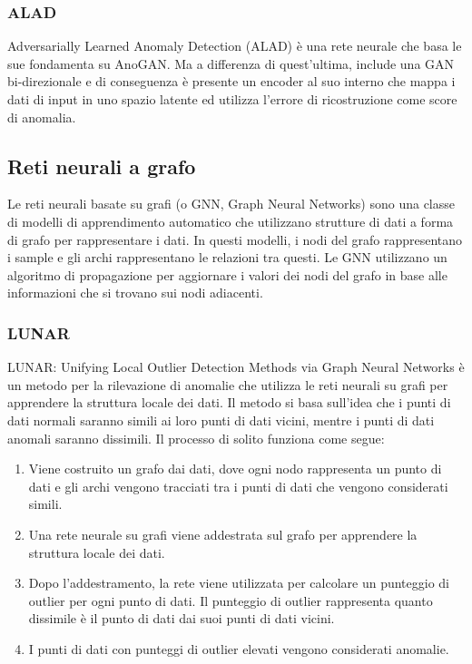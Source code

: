 \subsubsection{ALAD}
Adversarially Learned Anomaly Detection (ALAD) \cite{zenati2018adversarially} è una rete neurale che basa le sue fondamenta su AnoGAN. Ma a differenza di quest'ultima, include una GAN bi-direzionale e di conseguenza è presente un encoder al suo interno che mappa i dati di input in uno spazio latente ed utilizza l'errore di ricostruzione come score di anomalia.

\subsection{Reti neurali a grafo}
Le reti neurali basate su grafi (o GNN, Graph Neural Networks) sono una classe di modelli di apprendimento automatico che utilizzano strutture di dati a forma di grafo per rappresentare i dati. In questi modelli, i nodi del grafo rappresentano i sample e gli archi rappresentano le relazioni tra questi. Le GNN utilizzano un algoritmo di propagazione per aggiornare i valori dei nodi del grafo in base alle informazioni che si trovano sui nodi adiacenti.

\subsubsection{LUNAR}
LUNAR: Unifying Local Outlier Detection Methods via Graph Neural Networks \cite{goodge2022lunar} è un metodo per la rilevazione di anomalie che utilizza le reti neurali su grafi per apprendere la struttura locale dei dati. Il metodo si basa sull'idea che i punti di dati normali saranno simili ai loro punti di dati vicini, mentre i punti di dati anomali saranno dissimili.
Il processo di solito funziona come segue:
\begin{enumerate}
\item Viene costruito un grafo dai dati, dove ogni nodo rappresenta un punto di dati e gli archi vengono tracciati tra i punti di dati che vengono considerati simili.
\item Una rete neurale su grafi viene addestrata sul grafo per apprendere la struttura locale dei dati.
\item Dopo l'addestramento, la rete viene utilizzata per calcolare un punteggio di outlier per ogni punto di dati. Il punteggio di outlier rappresenta quanto dissimile è il punto di dati dai suoi punti di dati vicini.
\item I punti di dati con punteggi di outlier elevati vengono considerati anomalie.

\end{enumerate}

